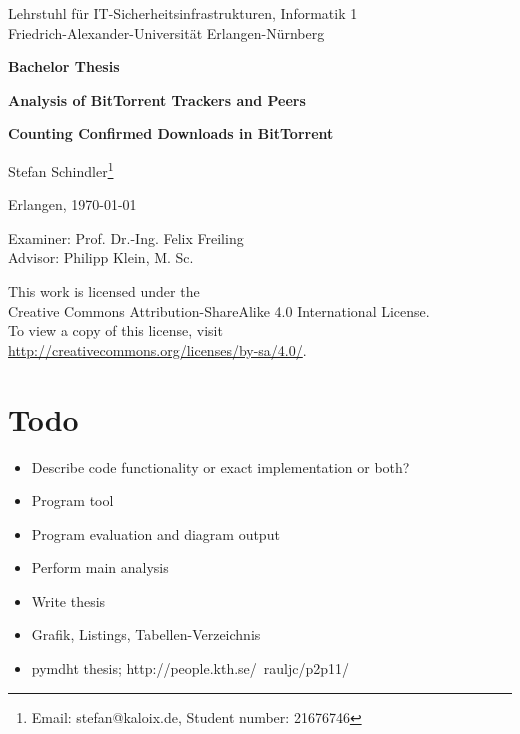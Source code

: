 \documentclass[10pt, a4paper]{scrartcl} %
\renewcommand{\_}{\origunderscore\allowbreak}
\begin{document}
\begin{titlepage}
\begin{center}
\large{Lehrstuhl für IT-Sicherheitsinfrastrukturen, Informatik 1\\
Friedrich-Alexander-Universität Erlangen-Nürnberg}

\vspace{2cm}
\textbf{\Large{Bachelor Thesis}}

\vspace{1cm}
\textbf{\textsf{\huge{Analysis of BitTorrent Trackers and Peers}}}

\vspace{0.4cm}
\textbf{\textsf{\LARGE{Counting Confirmed Downloads in BitTorrent}}}

\vspace{1cm}
\Large{Stefan Schindler\footnote{Email: stefan@kaloix.de, Student number: 21676746}}

\vspace{1cm}
\Large{Erlangen, \today}

\vspace{6cm}
\large{Examiner: Prof. Dr.-Ing. Felix Freiling\\
Advisor: Philipp Klein, M. Sc.}

\vspace{2cm}
\large{This work is licensed under the\\
Creative Commons Attribution-ShareAlike 4.0 International License.\\
To view a copy of this license, visit\\
\url{http://creativecommons.org/licenses/by-sa/4.0/}.}
\end{center}
\end{titlepage}

\section*{Todo}
\begin{itemize}
  \item Describe code functionality or exact implementation or both?
\end{itemize}

\begin{itemize}
  \item Program tool
  \item Program evaluation and diagram output
  \item Perform main analysis
  \item Write thesis
  \item Grafik, Listings, Tabellen-Verzeichnis
  \item pymdht thesis; http://people.kth.se/~rauljc/p2p11/
\end{itemize}
\end{document}
